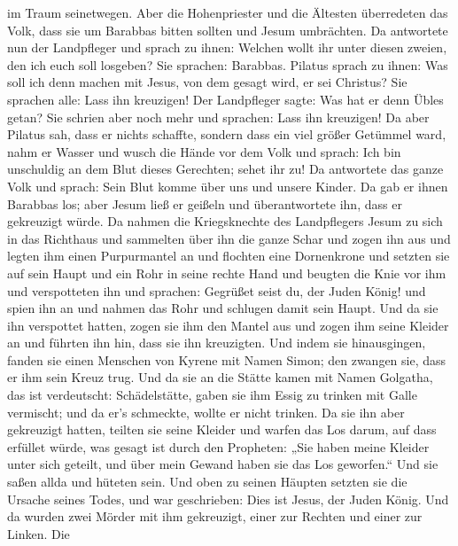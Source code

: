 im Traum seinetwegen.  Aber die Hohenpriester und die
Ältesten überredeten das Volk, dass sie um Barabbas bitten sollten und
Jesum umbrächten.  Da antwortete nun der Landpfleger und
sprach zu ihnen: Welchen wollt ihr unter diesen zweien, den ich euch
soll losgeben? Sie sprachen: Barabbas.  Pilatus sprach zu
ihnen: Was soll ich denn machen mit Jesus, von dem gesagt wird, er sei
Christus? Sie sprachen alle: Lass ihn kreuzigen!  Der
Landpfleger sagte: Was hat er denn Übles getan? Sie schrien aber noch
mehr und sprachen: Lass ihn kreuzigen!  Da aber Pilatus
sah, dass er nichts schaffte, sondern dass ein viel größer Getümmel
ward, nahm er Wasser und wusch die Hände vor dem Volk und sprach: Ich
bin unschuldig an dem Blut dieses Gerechten; sehet ihr zu! 
Da antwortete das ganze Volk und sprach: Sein Blut komme über uns und
unsere Kinder.  Da gab er ihnen Barabbas los; aber Jesum
ließ er geißeln und überantwortete ihn, dass er gekreuzigt würde.
 Da nahmen die Kriegsknechte des Landpflegers Jesum zu sich
in das Richthaus und sammelten über ihn die ganze Schar 
und zogen ihn aus und legten ihm einen Purpurmantel an  und
flochten eine Dornenkrone und setzten sie auf sein Haupt und ein Rohr in
seine rechte Hand und beugten die Knie vor ihm und verspotteten ihn und
sprachen: Gegrüßet seist du, der Juden König!  und spien
ihn an und nahmen das Rohr und schlugen damit sein Haupt. 
Und da sie ihn verspottet hatten, zogen sie ihm den Mantel aus und zogen
ihm seine Kleider an und führten ihn hin, dass sie ihn kreuzigten.
 Und indem sie hinausgingen, fanden sie einen Menschen von
Kyrene mit Namen Simon; den zwangen sie, dass er ihm sein Kreuz trug.
 Und da sie an die Stätte kamen mit Namen Golgatha, das ist
verdeutscht: Schädelstätte,  gaben sie ihm Essig zu trinken
mit Galle vermischt; und da er's schmeckte, wollte er nicht trinken.
 Da sie ihn aber gekreuzigt hatten, teilten sie seine
Kleider und warfen das Los darum, auf dass erfüllet würde, was gesagt
ist durch den Propheten: „Sie haben meine Kleider unter sich geteilt,
und über mein Gewand haben sie das Los geworfen.``  Und sie
saßen allda und hüteten sein.  Und oben zu seinen Häupten
setzten sie die Ursache seines Todes, und war geschrieben: Dies ist
Jesus, der Juden König.  Und da wurden zwei Mörder mit ihm
gekreuzigt, einer zur Rechten und einer zur Linken.  Die

